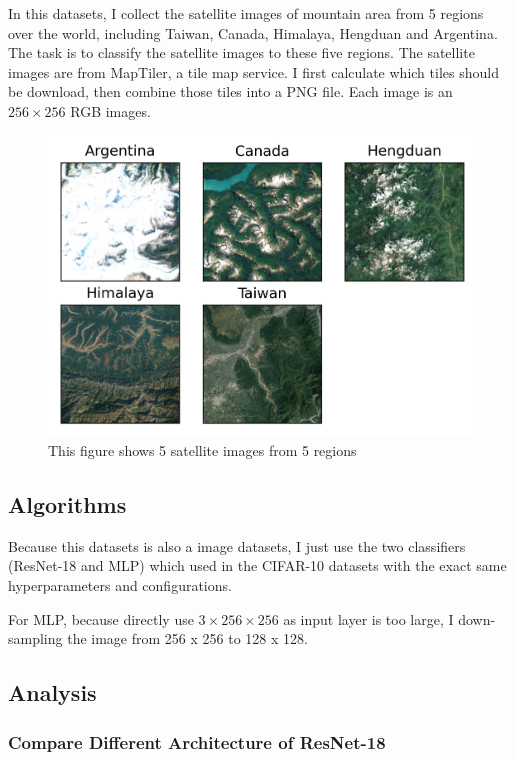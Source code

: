 \documentclass[twocolumn]{extarticle}
\begin{document}
In this datasets, I collect the satellite images of mountain area from 5 regions over the world, including Taiwan, Canada, Himalaya, Hengduan and Argentina. The task is to classify the satellite images to these five regions. The satellite images are from MapTiler, a tile map service. I first calculate which tiles should be download, then combine those tiles into a PNG file. Each image is an $256 \times 256$ RGB images.

\begin{figure}[H]
\centering
\includegraphics[width=0.9\linewidth]{figure/terrain_regions}
\caption{This figure shows 5 satellite images from 5 regions}
\label{fig:terrainregions}
\end{figure}

\subsection{Algorithms}

Because this datasets is also a image datasets, I just use the two classifiers (ResNet-18 and MLP) which used in the CIFAR-10 datasets with the exact same hyperparameters and configurations.

For MLP, because directly use $3 \times 256 \times 256$ as input layer is too large, I down-sampling the image from 256 x 256 to 128 x 128.

\subsection{Analysis}
\subsubsection{Compare Different Architecture of ResNet-18}
\end{document}
